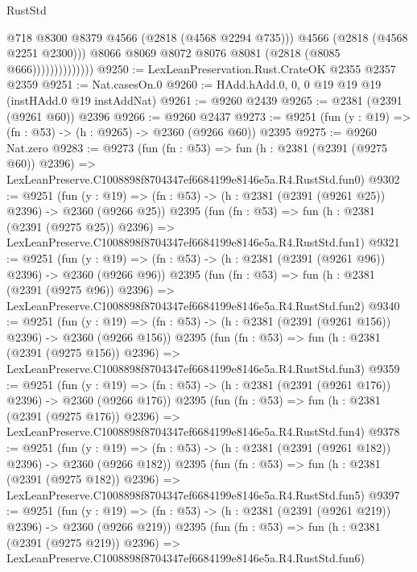 \begin{lexlean}{RustStd}
\begin{coremodule}
                                @718
                                @8300
                                @8379
                                @4566
                                (@2818 (@4568 @2294 @735)))
                              @4566
                              (@2818 (@4568 @2251 @2300)))
                            @8066
                            @8069
                            @8072
                            @8076
                            @8081
                            (@2818 (@8085 @666))))))))))))))
@9250 := LexLeanPreservation.Rust.CrateOK @2355 @2357 @2359
@9251 := Nat.casesOn.{0}
@9260 := HAdd.hAdd.{0, 0, 0} @19 @19 @19 (instHAdd.{0} @19 instAddNat)
@9261 := @9260 @2439
@9265 := @2381 (@2391 (@9261 @60)) @2396
@9266 := @9260 @2437
@9273 := @9251 (fun (y : @19) => (fn : @53) -> (h : @9265) -> @2360 (@9266 @60)) @2395
@9275 := @9260 Nat.zero
@9283 := @9273
    (fun (fn : @53) =>
    fun (h : @2381 (@2391 (@9275 @60)) @2396) =>
    LexLeanPreserve.C1008898f8704347ef6684199e8146e5a.R4.RustStd.fun0)
@9302 := @9251
    (fun (y : @19) => (fn : @53) -> (h : @2381 (@2391 (@9261 @25)) @2396) -> @2360 (@9266 @25))
    @2395
    (fun (fn : @53) =>
    fun (h : @2381 (@2391 (@9275 @25)) @2396) =>
    LexLeanPreserve.C1008898f8704347ef6684199e8146e5a.R4.RustStd.fun1)
@9321 := @9251
    (fun (y : @19) => (fn : @53) -> (h : @2381 (@2391 (@9261 @96)) @2396) -> @2360 (@9266 @96))
    @2395
    (fun (fn : @53) =>
    fun (h : @2381 (@2391 (@9275 @96)) @2396) =>
    LexLeanPreserve.C1008898f8704347ef6684199e8146e5a.R4.RustStd.fun2)
@9340 := @9251
    (fun (y : @19) => (fn : @53) -> (h : @2381 (@2391 (@9261 @156)) @2396) -> @2360 (@9266 @156))
    @2395
    (fun (fn : @53) =>
    fun (h : @2381 (@2391 (@9275 @156)) @2396) =>
    LexLeanPreserve.C1008898f8704347ef6684199e8146e5a.R4.RustStd.fun3)
@9359 := @9251
    (fun (y : @19) => (fn : @53) -> (h : @2381 (@2391 (@9261 @176)) @2396) -> @2360 (@9266 @176))
    @2395
    (fun (fn : @53) =>
    fun (h : @2381 (@2391 (@9275 @176)) @2396) =>
    LexLeanPreserve.C1008898f8704347ef6684199e8146e5a.R4.RustStd.fun4)
@9378 := @9251
    (fun (y : @19) => (fn : @53) -> (h : @2381 (@2391 (@9261 @182)) @2396) -> @2360 (@9266 @182))
    @2395
    (fun (fn : @53) =>
    fun (h : @2381 (@2391 (@9275 @182)) @2396) =>
    LexLeanPreserve.C1008898f8704347ef6684199e8146e5a.R4.RustStd.fun5)
@9397 := @9251
    (fun (y : @19) => (fn : @53) -> (h : @2381 (@2391 (@9261 @219)) @2396) -> @2360 (@9266 @219))
    @2395
    (fun (fn : @53) =>
    fun (h : @2381 (@2391 (@9275 @219)) @2396) =>
    LexLeanPreserve.C1008898f8704347ef6684199e8146e5a.R4.RustStd.fun6)

\end{coremodule}
\end{lexlean}
